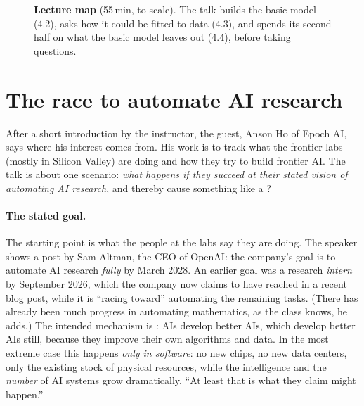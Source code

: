 \begin{figure}[tb]
\centering
{}
\caption{\textbf{Lecture map} (55\,min, to scale). The talk builds the basic model (4.2), asks how it could be fitted to data (4.3), and spends its second half on what the basic model leaves out (4.4), before taking questions.}
\end{figure}

\section{The race to automate AI research}\label{sec:L4-race}
After a short introduction by the instructor, the guest, Anson Ho\flag{} of Epoch AI, says where his interest comes from. His work is to track what the frontier labs (mostly in Silicon Valley) are doing and how they try to build frontier AI. The talk is about one scenario: \emph{what happens if they succeed at their stated vision of automating AI research}, and thereby cause something like a ?

\paragraph{The stated goal.}
The starting point is what the people at the labs say they are doing. The speaker shows a post by Sam Altman, the CEO of OpenAI: the company's goal is to automate AI research \emph{fully} by March 2028. An earlier goal was a research \emph{intern} by September 2026, which the company now claims to have reached in a recent blog post, while it is ``racing toward'' automating the remaining tasks. (There has already been much progress in automating mathematics, as the class knows, he adds.)
The intended mechanism is : AIs develop better AIs, which develop better AIs still, because they improve their own algorithms and data. In the most extreme case this happens \emph{only in software}: no new chips, no new data centers, only the existing stock of physical resources, while the intelligence and the \emph{number} of AI systems grow dramatically. ``At least that is what they claim might happen.''

